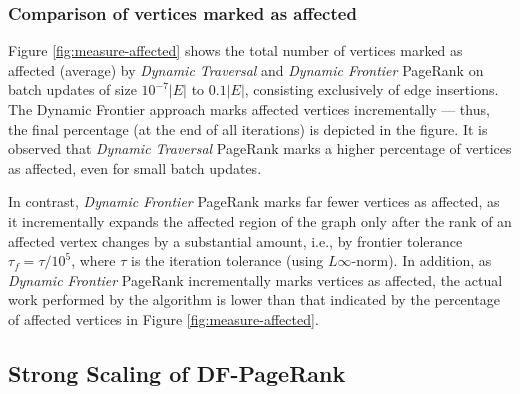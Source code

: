 \subsubsection{Comparison of vertices marked as affected}

Figure \ref{fig:measure-affected} shows the total number of vertices marked as affected (average) by \textit{Dynamic Traversal} and \textit{Dynamic Frontier} PageRank on batch updates of size $10^{-7}|E|$ to $0.1|E|$, consisting exclusively of edge insertions. The Dynamic Frontier approach marks affected vertices incrementally --- thus, the final percentage (at the end of all iterations) is depicted in the figure. It is observed that \textit{Dynamic Traversal} PageRank marks a higher percentage of vertices as affected, even for small batch updates. In contrast, \textit{Dynamic Frontier} PageRank marks far fewer vertices as affected, as it incrementally expands the affected region of the graph only after the rank of an affected vertex changes by a substantial amount, i.e., by frontier tolerance $\tau_f = \tau / 10^5$, where $\tau$ is the iteration tolerance (using $L\infty$-norm). In addition, as \textit{Dynamic Frontier} PageRank incrementally marks vertices as affected, the actual work performed by the algorithm is lower than that indicated by the percentage of affected vertices in Figure \ref{fig:measure-affected}.















\subsection{Strong Scaling of DF-PageRank}

